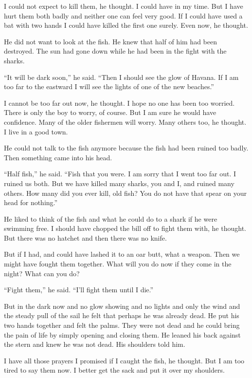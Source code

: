 \documentclass[fontset=ubuntu]{ctexrep}
\begin{document}
I could not expect to kill them, he thought. I could have in my time. But I
have hurt them both badly and neither one can feel very good. If I could
have used a bat with two hands I could have killed the first one surely.
Even now, he thought.

He did not want to look at the fish. He knew that half of him had been
destroyed. The sun had gone down while he had been in the fight with the
sharks.

``It will be dark soon,'' he said. ``Then I should see the glow of Havana.
If I am too far to the eastward I will see the lights of one of the new
beaches.''

I cannot be too far out now, he thought. I hope no one has been too worried.
There is only the boy to worry, of course. But I am sure he would have
\gls{confidence}. Many of the older fishermen will worry. Many others too,
he thought. I live in a good town.

He could not talk to the fish anymore because the fish had been \gls{ruined}
too badly. Then something came into his head.

``Half fish,'' he said. ``Fish that you were. I am sorry that I went too far
out. I ruined us both. But we have killed many sharks, you and I, and ruined
many others. How many did you ever kill, old fish? You do not have that
spear on your head for nothing.''

He liked to think of the fish and what he could do to a shark if he were
swimming free. I should have \gls{chopped} the bill off to fight them with,
he thought. But there was no \gls{hatchet} and then there was no knife.

But if I had, and could have lashed it to an oar \gls{butt}, what a weapon.
Then we might have fought them together. What will you do now if they come
in the night? What can you do?

``Fight them,'' he said. ``I'll fight them until I die.''

But in the dark now and no glow showing and no lights and only the wind and
the steady pull of the sail he felt that perhaps he was already dead. He put
his two hands together and felt the palms. They were not dead and he could
bring the pain of life by simply opening and closing them. He leaned his
back against the stern and knew he was not dead. His shoulders told him.

I have all those prayers I promised if I caught the fish, he thought. But I
am too tired to say them now. I better get the sack and put it over my
shoulders.
\end{document}

